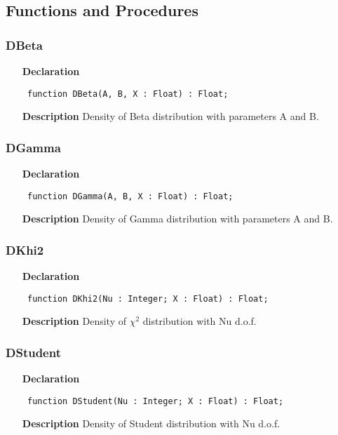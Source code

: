 \documentclass[12pt,a4paper,oneside]{report}
\newcommand{\declarationitem}[1]{\textbf{#1}}
\newcommand{\descriptiontitle}[1]{\textbf{#1}}
\newcommand{\code}[1]{\texttt{#1}}
\begin{document}
\subsection{Functions and Procedures}
\subsubsection{DBeta}
\label{ugamdist-DBeta}
\begin{itemize}\item[\declarationitem{Declaration}\hfill]
	\begin{flushleft}
		\code{
			function DBeta(A, B, X : Float) : Float;}
	\end{flushleft}
	\item[\descriptiontitle{Description}]
	Density of Beta distribution with parameters A and B.
\end{itemize}
\subsubsection{DGamma}
\label{ugamdist-DGamma}
\begin{itemize}\item[\declarationitem{Declaration}\hfill]
	\begin{flushleft}
		\code{
			function DGamma(A, B, X : Float) : Float;}
	\end{flushleft}
	\item[\descriptiontitle{Description}]
	Density of Gamma distribution with parameters A and B.
\end{itemize}
\subsubsection{DKhi2}
\label{ugamdist-DKhi2}
\begin{itemize}\item[\declarationitem{Declaration}\hfill]
	\begin{flushleft}
		\code{
			function DKhi2(Nu : Integer; X : Float) : Float;}
	\end{flushleft}
	\item[\descriptiontitle{Description}]
	Density of $\chi^2$ distribution with Nu d.o.f.
\end{itemize}
\subsubsection{DStudent}
\label{ugamdist-DStudent}
\begin{itemize}\item[\declarationitem{Declaration}\hfill]
	\begin{flushleft}
		\code{
			function DStudent(Nu : Integer; X : Float) : Float;}
	\end{flushleft}
	\item[\descriptiontitle{Description}]
	Density of Student distribution with Nu d.o.f.
\end{itemize}
\end{document}
